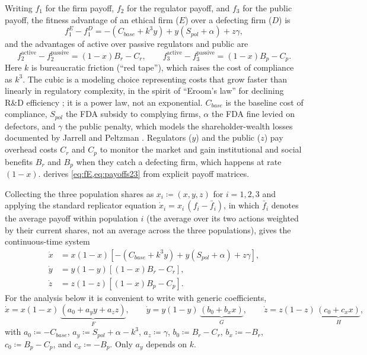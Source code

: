\documentclass[10pt]{article}
\begin{document}
Writing $f_1$ for the firm payoff, $f_2$ for the regulator payoff, and $f_3$ for the public payoff, the fitness advantage of an ethical firm ($E$) over a defecting firm ($D$) is
\begin{equation}
f_1^E - f_1^D = -(C_{base} + k^3 y) + y(S_{pol} + \alpha) + z\gamma ,
\label{eq:fE}
\end{equation}
and the advantages of active over passive regulators and public are
\begin{equation}
f_2^{\text{active}} - f_2^{\text{passive}} = (1-x)B_r - C_r,
\qquad
f_3^{\text{active}} - f_3^{\text{passive}} = (1-x)B_p - C_p .
\label{eq:payoffs23}
\end{equation}
Here $k$ is bureaucratic friction (``red tape''), which raises the cost of compliance as $k^3$. The cubic is a modeling choice representing costs that grow faster than linearly in regulatory complexity, in the spirit of ``Eroom's law'' for declining R\&D efficiency \cite{scannell2012}; it is a power law, not an exponential. $C_{base}$ is the baseline cost of compliance, $S_{pol}$ the FDA subsidy to complying firms, $\alpha$ the FDA fine levied on defectors, and $\gamma$ the public penalty, which models the shareholder-wealth losses documented by Jarrell and Peltzman \cite{jarrell1985}. Regulators ($y$) and the public ($z$) pay overhead costs $C_r$ and $C_p$ to monitor the market and gain institutional and social benefits $B_r$ and $B_p$ when they catch a defecting firm, which happens at rate $(1-x)$.  derives \cref{eq:fE,eq:payoffs23} from explicit payoff matrices.

Collecting the three population shares as $x_i \coloneqq (x,y,z)$ for $i=1,2,3$ and applying the standard replicator equation $\dot{x}_i = x_i\,(f_i - \bar{f}_i)$, in which $\bar{f}_i$ denotes the average payoff within population $i$ (the average over its two actions weighted by their current shares, not an average across the three populations), gives the continuous-time system
\begin{align}
\dot{x} &= x(1-x) \left[ -(C_{base} + k^3 y) + y(S_{pol} + \alpha) + z\gamma \right], \label{eq:x} \\
\dot{y} &= y(1-y) \left[ (1-x)B_r - C_r \right], \label{eq:y} \\
\dot{z} &= z(1-z) \left[ (1-x)B_p - C_p \right]. \label{eq:z}
\end{align}
For the analysis below it is convenient to write  with generic coefficients,
\begin{equation}
\dot x = x(1-x)\,\underbrace{(a_0 + a_y y + a_z z)}_{\textstyle F},\qquad
\dot y = y(1-y)\,\underbrace{(b_0 + b_x x)}_{\textstyle G},\qquad
\dot z = z(1-z)\,\underbrace{(c_0 + c_x x)}_{\textstyle H},
\label{eq:generic}
\end{equation}
with $a_0\coloneqq-C_{base}$, $a_y\coloneqq S_{pol}+\alpha-k^3$, $a_z\coloneqq\gamma$, $b_0\coloneqq B_r-C_r$, $b_x\coloneqq-B_r$, $c_0\coloneqq B_p-C_p$, and $c_x\coloneqq-B_p$. Only $a_y$ depends on $k$.
\end{document}
